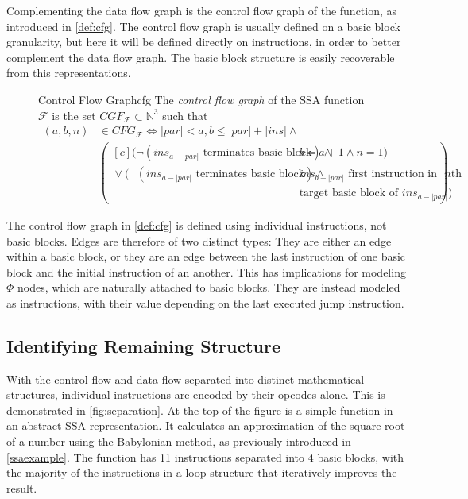     Complementing the data flow graph is the control flow graph of the function,
    as introduced in \autoref{def:cfg}.
    The control flow graph is usually defined on a basic block granularity, but
    here it will be defined directly on instructions, in order to better
    complement the data flow graph.
    The basic block structure is easily recoverable from this representations.

\begin{figure}[h]
\begin{definition}{Control Flow Graph}{cfg}
    The {\em control flow graph} of the SSA function $\mathcal F$ is the set
    $CGF_{\mathcal F}\subset \mathbb N^3$ such that
    \begin{align*}
        (a,b,n)&{}\in CFG_{\mathcal F}\iff |par|<a,b\leq |par|+|ins|\mathrel{\land}\\
               &\left(\begin{aligned}[c]
                                    (\neg (ins_{a-|par|}\text{ terminates basic block})\mathrel{\land}{}&b=a+1\mathrel{\land}n=1)\\
                      \mathrel{\lor}(\phantom{\neg}(ins_{a-|par|}\text{ terminates basic block})\mathrel{\land}{}&ins_{b-|par|}\text{ first instruction in}\text{ $n$th}\\[-0.5em]
                                                   &\text{target basic block of }ins_{a-|par|})
        \end{aligned}\right).
    \end{align*}
\end{definition}
\end{figure}

    The control flow graph in \autoref{def:cfg} is defined using individual
    instructions, not basic blocks.
    Edges are therefore of two distinct types:
    They are either an edge within a basic block, or they are an edge between
    the last instruction of one basic block and the initial instruction of an
    another.
    This has implications for modeling $\Phi$ nodes, which are naturally
    attached to basic blocks.
    They are instead modeled as instructions, with their value depending on the
    last executed jump instruction.

\subsection{Identifying Remaining Structure}

    With the control flow and data flow separated into distinct mathematical
    structures, individual instructions are encoded by their opcodes alone.
    This is demonstrated in \autoref{fig:separation}.
    At the top of the figure is a simple function in an abstract SSA
    representation.
    It calculates an approximation of the square root of a number using the
    Babylonian method, as previously introduced in \autoref{ssaexample}.
    The function has 11 instructions separated into 4 basic blocks, with the
    majority of the instructions in a loop structure that iteratively improves
    the result.

